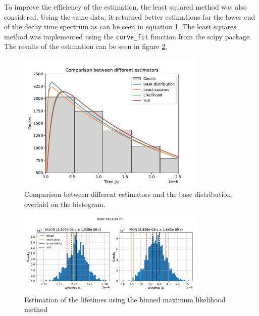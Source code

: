 \documentclass[11pt, a4paper, oneside]{book}
\newcommand\Plotwidth{0.8}
\begin{document}
To improve the efficiency of the estimation, the least squared method was also considered. Using the same data, it returned better estimations for the lower end of the decay time spectrum as can be seen in equation \ref{fig:comparison_estimators}. The least squares method was implemented using the \lstinline|curve_fit| function from the scipy package. The results of the estimation can be seen in figure \ref{fig:least_squares_results}.

\begin{figure}[H]
    \centering
    \includegraphics[width=\Plotwidth\textwidth]{images/comparison_estimators.pdf}
    \caption{Comparison between different estimators and the base distribution, overlaid on the histogram.}
    \label{fig:comparison_estimators}
\end{figure}

\begin{figure}[H]
  \centering
  \includegraphics[width=\Plotwidth\textwidth]{images/estimators_hist_least_squares.pdf}
  \caption{Estimation of the lifetimes using the binned maximum likelihood method}
  \label{fig:least_squares_results}
\end{figure}
\end{document}
